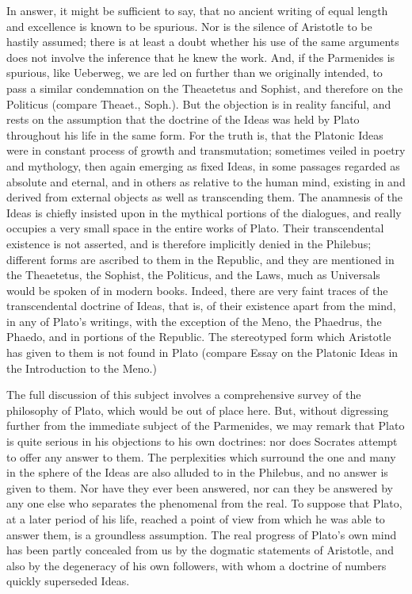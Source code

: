 \documentclass[11pt,letter]{article}
\begin{document}
\par  In answer, it might be sufficient to say, that no ancient writing of equal length and excellence is known to be spurious. Nor is the silence of Aristotle to be hastily assumed; there is at least a doubt whether his use of the same arguments does not involve the inference that he knew the work. And, if the Parmenides is spurious, like Ueberweg, we are led on further than we originally intended, to pass a similar condemnation on the Theaetetus and Sophist, and therefore on the Politicus (compare Theaet., Soph.). But the objection is in reality fanciful, and rests on the assumption that the doctrine of the Ideas was held by Plato throughout his life in the same form. For the truth is, that the Platonic Ideas were in constant process of growth and transmutation; sometimes veiled in poetry and mythology, then again emerging as fixed Ideas, in some passages regarded as absolute and eternal, and in others as relative to the human mind, existing in and derived from external objects as well as transcending them. The anamnesis of the Ideas is chiefly insisted upon in the mythical portions of the dialogues, and really occupies a very small space in the entire works of Plato. Their transcendental existence is not asserted, and is therefore implicitly denied in the Philebus; different forms are ascribed to them in the Republic, and they are mentioned in the Theaetetus, the Sophist, the Politicus, and the Laws, much as Universals would be spoken of in modern books. Indeed, there are very faint traces of the transcendental doctrine of Ideas, that is, of their existence apart from the mind, in any of Plato's writings, with the exception of the Meno, the Phaedrus, the Phaedo, and in portions of the Republic. The stereotyped form which Aristotle has given to them is not found in Plato (compare Essay on the Platonic Ideas in the Introduction to the Meno.)

\par  The full discussion of this subject involves a comprehensive survey of the philosophy of Plato, which would be out of place here. But, without digressing further from the immediate subject of the Parmenides, we may remark that Plato is quite serious in his objections to his own doctrines: nor does Socrates attempt to offer any answer to them. The perplexities which surround the one and many in the sphere of the Ideas are also alluded to in the Philebus, and no answer is given to them. Nor have they ever been answered, nor can they be answered by any one else who separates the phenomenal from the real. To suppose that Plato, at a later period of his life, reached a point of view from which he was able to answer them, is a groundless assumption. The real progress of Plato's own mind has been partly concealed from us by the dogmatic statements of Aristotle, and also by the degeneracy of his own followers, with whom a doctrine of numbers quickly superseded Ideas.
\end{document}
